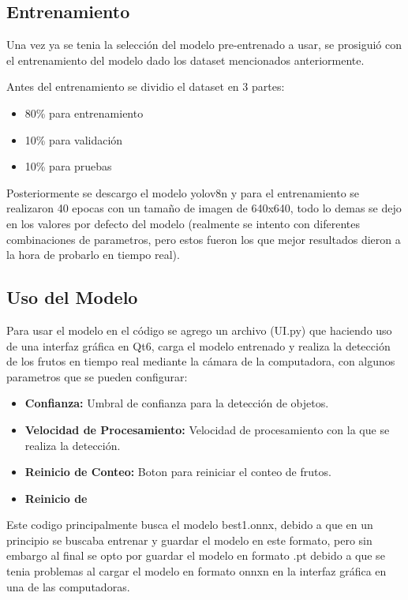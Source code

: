 \documentclass[conference]{IEEEtran}
\begin{document}
\subsection{Entrenamiento}
Una vez ya se tenia la selección del modelo pre-entrenado a usar, se prosiguió con el entrenamiento del modelo dado los dataset mencionados anteriormente\cite{}.

Antes del entrenamiento se dividio el dataset en 3 partes:
\begin{itemize}
    \item 80\% para entrenamiento
    \item 10\% para validación
    \item 10\% para pruebas
\end{itemize}

Posteriormente se descargo el modelo yolov8n\cite{} y para el entrenamiento se realizaron 40 epocas con un tamaño de imagen de 640x640, todo lo demas se dejo en los valores por defecto del modelo (realmente se intento con diferentes combinaciones de parametros, pero estos fueron los que mejor resultados dieron a la hora de probarlo en tiempo real).

\subsection{Uso del Modelo}
Para usar el modelo en el código se agrego un archivo (UI.py) que haciendo uso de una interfaz gráfica en Qt6, carga el modelo entrenado y realiza la detección de los frutos en tiempo real mediante la cámara de la computadora, con algunos parametros que se pueden configurar:

\begin{itemize}
    \item \textbf{Confianza:} Umbral de confianza para la detección de objetos.
    \item \textbf{Velocidad de Procesamiento:} Velocidad de procesamiento con la que se realiza la detección.
    \item \textbf{Reinicio de Conteo:} Boton para reiniciar el conteo de frutos.
    \item \textbf{Reinicio de }
\end{itemize}

Este codigo principalmente busca el modelo best1.onnx, debido a que en un principio se buscaba entrenar y guardar el modelo en este formato, pero sin embargo al final se opto por guardar el modelo en formato .pt debido a que se tenia problemas al cargar el modelo en formato onnxn en la interfaz gráfica en una de las computadoras.
\end{document}
